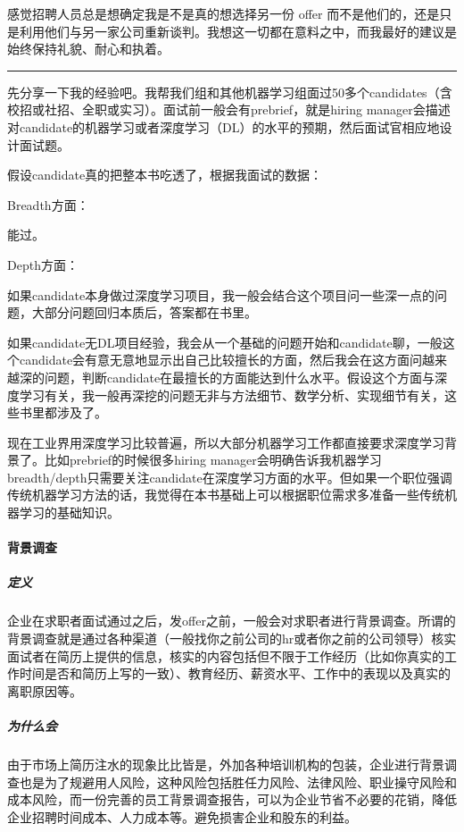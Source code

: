 \documentclass[letterpaper,10pt,english]{sphinxmanual}
\begin{document}
感觉招聘人员总是想确定我是不是真的想选择另一份 offer
而不是他们的，还是只是利用他们与另一家公司重新谈判。我想这一切都在意料之中，而我最好的建议是始终保持礼貌、耐心和执着。


\bigskip\hrule\bigskip


先分享一下我的经验吧。我帮我们组和其他机器学习组面过50多个candidates（含校招或社招、全职或实习）。面试前一般会有prebrief，就是hiring
manager会描述对candidate的机器学习或者深度学习（DL）的水平的预期，然后面试官相应地设计面试题。

假设candidate真的把整本书吃透了，根据我面试的数据：

Breadth方面：

能过。

Depth方面：

如果candidate本身做过深度学习项目，我一般会结合这个项目问一些深一点的问题，大部分问题回归本质后，答案都在书里。

如果candidate无DL项目经验，我会从一个基础的问题开始和candidate聊，一般这个candidate会有意无意地显示出自己比较擅长的方面，然后我会在这方面问越来越深的问题，判断candidate在最擅长的方面能达到什么水平。假设这个方面与深度学习有关，我一般再深挖的问题无非与方法细节、数学分析、实现细节有关，这些书里都涉及了。

现在工业界用深度学习比较普遍，所以大部分机器学习工作都直接要求深度学习背景了。比如prebrief的时候很多hiring
manager会明确告诉我机器学习breadth/depth只需要关注candidate在深度学习方面的水平。但如果一个职位强调传统机器学习方法的话，我觉得在本书基础上可以根据职位需求多准备一些传统机器学习的基础知识。


\paragraph{背景调查}
\label{\detokenize{chapter_interview/background_survey:id1}}\label{\detokenize{chapter_interview/background_survey::doc}}

\subparagraph{定义}
\label{\detokenize{chapter_interview/background_survey:id2}}
企业在求职者面试通过之后，发offer之前，一般会对求职者进行背景调查。所谓的背景调查就是通过各种渠道（一般找你之前公司的hr或者你之前的公司领导）核实面试者在简历上提供的信息，核实的内容包括但不限于工作经历（比如你真实的工作时间是否和简历上写的一致）、教育经历、薪资水平、工作中的表现以及真实的离职原因等。


\subparagraph{为什么会}
\label{\detokenize{chapter_interview/background_survey:id3}}
由于市场上简历注水的现象比比皆是，外加各种培训机构的包装，企业进行背景调查也是为了规避用人风险，这种风险包括胜任力风险、法律风险、职业操守风险和成本风险，而一份完善的员工背景调查报告，可以为企业节省不必要的花销，降低企业招聘时间成本、人力成本等。避免损害企业和股东的利益。
\end{document}
